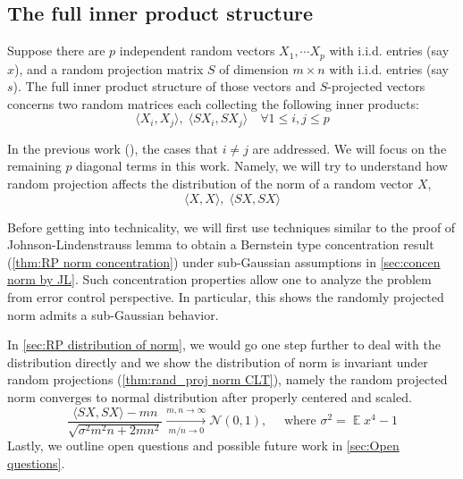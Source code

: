\documentclass[12pt]{extarticle}
\newcommand{\cN}{{\mathcal{N}}}
\newcommand{\1}{\field{1}}
\DeclareMathOperator{\E}{\mathbb{E}}
\numberwithin{equation}{section}
\begin{document}

\subsection{The full inner product structure}\label{sec:RP full structure}


Suppose there are $p$ independent random vectors $X_1, \cdots X_p$ with i.i.d. entries (say $x$), and a random projection matrix $S$ of dimension $m\times n$ with i.i.d. entries (say $s$). The full inner product structure of those vectors and $S$-projected vectors concerns two random matrices each collecting the following inner products:
 \[
 \langle X_i, X_j \rangle, \;  \langle SX_i, SX_j \rangle \quad \forall 1\le i, j \le p
 \]
 
 In the previous work (\cite{duan2021invariance}), the cases that $i\neq j$ are addressed.
 We will focus on the remaining $p$ diagonal terms in this work.  Namely, we will try to understand how random projection affects the distribution of the norm of a random vector $X$,
 \[
 \langle X, X \rangle, \;  \langle SX, SX \rangle 
 \]




	
 Before getting into technicality, we will first use techniques similar to the proof of Johnson-Lindenstrauss lemma to obtain a Bernstein type concentration result (\cref{thm:RP norm concentration}) under sub-Gaussian assumptions in \cref{sec:concen norm by JL}.
Such concentration properties allow one to analyze the problem from error control perspective. In particular, this shows the randomly projected norm admits a sub-Gaussian behavior.

In \cref{sec:RP  distribution of norm}, we would go one step further to deal with the distribution directly and we show the distribution of norm is invariant under random projections (\cref{thm:rand_proj norm CLT}), namely the random projected norm converges to normal distribution after properly centered and scaled. 
\[
\frac{\langle SX, SX \rangle  - mn}{\sqrt{\sigma^2 m^2n+2mn^2}} \xrightarrow[ m/n\to 0 ]{ m,n\to \infty } \cN(0,1), \quad   \text{ where } \sigma^2 = \E x^4 -1 
\]
Lastly, we outline open questions and possible future work in \cref{sec:Open questions}.
 
\end{document}
